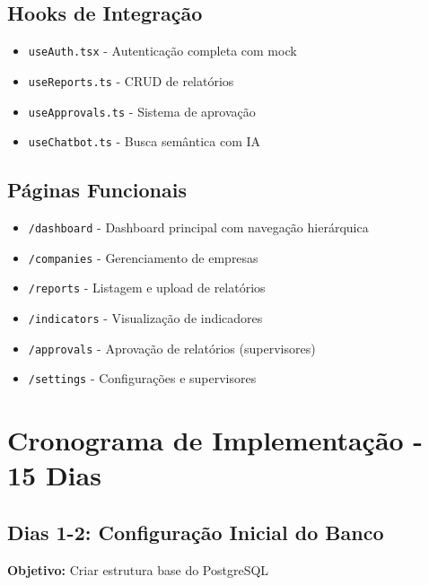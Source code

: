 \documentclass[12pt,a4paper]{article}
\newcommand{\checkbox}{$\square$}
\begin{document}
\subsection{Hooks de Integração}
\begin{itemize}[label=\checkbox]
    \item \texttt{useAuth.tsx} - Autenticação completa com mock
    \item \texttt{useReports.ts} - CRUD de relatórios
    \item \texttt{useApprovals.ts} - Sistema de aprovação
    \item \texttt{useChatbot.ts} - Busca semântica com IA
\end{itemize}

\subsection{Páginas Funcionais}
\begin{itemize}[label=\checkbox]
    \item \texttt{/dashboard} - Dashboard principal com navegação hierárquica
    \item \texttt{/companies} - Gerenciamento de empresas
    \item \texttt{/reports} - Listagem e upload de relatórios
    \item \texttt{/indicators} - Visualização de indicadores
    \item \texttt{/approvals} - Aprovação de relatórios (supervisores)
    \item \texttt{/settings} - Configurações e supervisores
\end{itemize}

\section{Cronograma de Implementação - 15 Dias}

\subsection{Dias 1-2: Configuração Inicial do Banco}

\begin{tcolorbox}[colback=green!5!white,colframe=neogreen]
\textbf{Objetivo:} Criar estrutura base do PostgreSQL
\end{tcolorbox}
\end{document}
